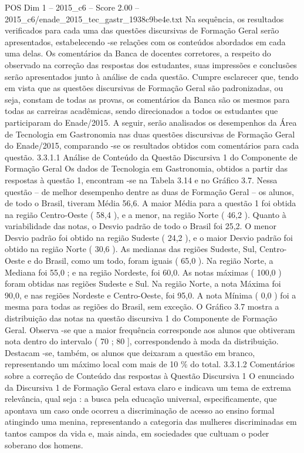 \begin{textsample}{POS Dim 1 – 2015\_c6 – Score 2.00 – 2015\_c6/enade\_2015\_tec\_gastr\_1938c9be4e.txt}
Na sequência, os resultados verificados para cada uma das questões discursivas de Formação Geral serão apresentados, estabelecendo -se relações com os conteúdos abordados em cada uma delas.
Os comentários da Banca de docentes corretores, a respeito do observado na correção das respostas dos estudantes, suas impressões e conclusões serão apresentados junto à análise de cada questão.
Cumpre esclarecer que, tendo em vista que as questões discursivas de Formação Geral são padronizadas, ou seja, constam de todas as provas, os comentários da Banca são os mesmos para todas as carreiras acadêmicas, sendo direcionados a todos os estudantes que participaram do Enade/2015.
A seguir, serão analisados os desempenhos da Área de Tecnologia em Gastronomia nas duas questões discursivas de Formação Geral do Enade/2015, comparando -se os resultados obtidos com comentários para cada questão. 3.3.1.1 Análise de Conteúdo da Questão Discursiva 1 do Componente de Formação Geral Os dados de Tecnologia em Gastronomia, obtidos a partir das respostas à questão 1, encontram -se na Tabela 3.14 e no Gráfico 3.7.
Nessa questão – de melhor desempenho dentre as duas de Formação Geral – os alunos, de todo o Brasil, tiveram Média 56,6.
A maior Média para a questão 1 foi obtida na região Centro-Oeste ( 58,4 ), e a menor, na região Norte ( 46,2 ).
Quanto à variabilidade das notas, o Desvio padrão de todo o Brasil foi 25,2.
O menor Desvio padrão foi obtido na região Sudeste ( 24,2 ), e o maior Desvio padrão foi obtido na região Norte ( 30,6 ).
As medianas das regiões Sudeste, Sul, Centro-Oeste e do Brasil, como um todo, foram iguais ( 65,0 ).
Na região Norte, a Mediana foi 55,0 ; e na região Nordeste, foi 60,0.
As notas máximas ( 100,0 ) foram obtidas nas regiões Sudeste e Sul.
Na região Norte, a nota Máxima foi 90,0, e nas regiões Nordeste e Centro-Oeste, foi 95,0.
A nota Mínima ( 0,0 ) foi a mesma para todas as regiões do Brasil, sem exceção.
O Gráfico 3.7 mostra a distribuição das notas na questão discursiva 1 do Componente de Formação Geral.
Observa -se que a maior frequência corresponde aos alunos que obtiveram nota dentro do intervalo ( 70 ; 80 ], correspondendo à moda da distribuição.
Destacam -se, também, os alunos que deixaram a questão em branco, representando um máximo local com mais de 10 \% do total. 3.3.1.2 Comentários sobre a correção de Conteúdo das respostas à Questão Discursiva 1 O enunciado da Discursiva 1 de Formação Geral estava claro e indicava um tema de extrema relevância, qual seja : a busca pela educação universal, especificamente, que apontava um caso onde ocorreu a discriminação de acesso ao ensino formal atingindo uma menina, representando a categoria das mulheres discriminadas em tantos campos da vida e, mais ainda, em sociedades que cultuam o poder soberano dos homens.

\end{textsample}
